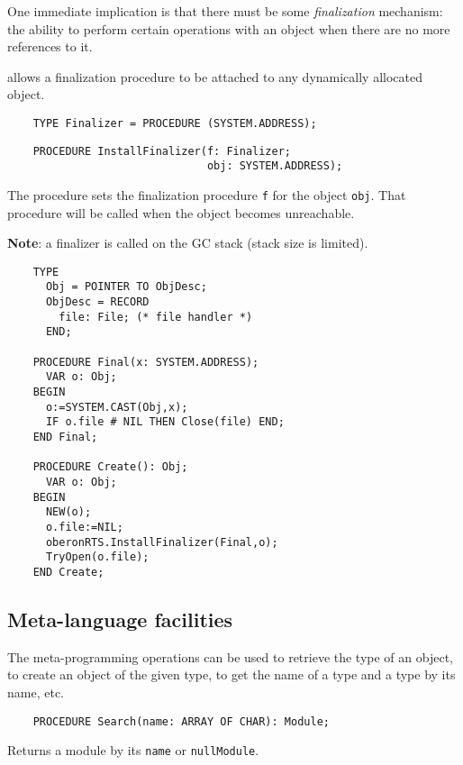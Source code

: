 One  immediate  implication  is  that  there  must  be  some {\em
finalization}   mechanism:   the ability  to  perform  certain
operations  with  an  object when there are no more references to it.

\XDS{} allows a finalization procedure to be attached to any
dynamically allocated object.


\verb'    TYPE Finalizer = PROCEDURE (SYSTEM.ADDRESS);'


\verb'    PROCEDURE InstallFinalizer(f: Finalizer;'\\
\verb'                               obj: SYSTEM.ADDRESS);'

The procedure sets the finalization procedure \verb'f' for the object
\verb'obj'.
That procedure will be called when the object becomes unreachable.

{\bf Note}: a finalizer is called on the GC stack (stack size is limited).

\Example
\begin{verbatim}
    TYPE
      Obj = POINTER TO ObjDesc;
      ObjDesc = RECORD
        file: File; (* file handler *)
      END;

    PROCEDURE Final(x: SYSTEM.ADDRESS);
      VAR o: Obj;
    BEGIN
      o:=SYSTEM.CAST(Obj,x);
      IF o.file # NIL THEN Close(file) END;
    END Final;

    PROCEDURE Create(): Obj;
      VAR o: Obj;
    BEGIN
      NEW(o);
      o.file:=NIL;
      oberonRTS.InstallFinalizer(Final,o);
      TryOpen(o.file);
    END Create;
\end{verbatim}

\subsection{Meta-language facilities}

The meta-programming operations can be used to retrieve the type of an
object, to create an object of the given type, to get the name of a
type and a type by its name, etc.


\verb'    PROCEDURE Search(name: ARRAY OF CHAR): Module;'

Returns a module by its \verb'name' or {\tt nullModule}.


